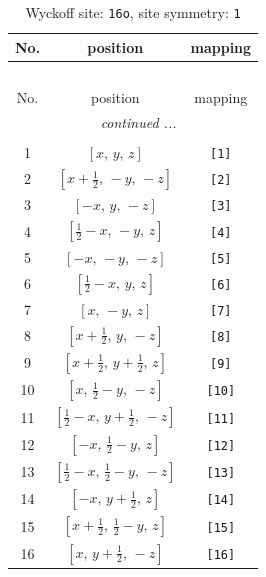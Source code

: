 \documentclass[fleqn,8pt]{jsarticle}
\begin{document}
\begin{longtable}{ccc}
\caption{Wyckoff site: {\tt 16o}, site symmetry: {\tt 1}}
 \\
 \hline \hline
No. & position & mapping \\ \hline \endfirsthead

\multicolumn{2}{l}{\tablename\ \thetable{}} \\
 \hline \hline
No. & position & mapping \\ \hline \endhead

 \hline \hline
\multicolumn{2}{r}{\footnotesize\it continued ...} \\ \endfoot

 \hline \hline
\multicolumn{2}{r}{} \\ \endlastfoot

1 & $\left[ x,\, y,\, z \right]$ & {\tt [1]} \\ \hline
2 & $\left[ x + \frac{1}{2},\, - y,\, - z \right]$ & {\tt [2]} \\ \hline
3 & $\left[ - x,\, y,\, - z \right]$ & {\tt [3]} \\ \hline
4 & $\left[ \frac{1}{2} - x,\, - y,\, z \right]$ & {\tt [4]} \\ \hline
5 & $\left[ - x,\, - y,\, - z \right]$ & {\tt [5]} \\ \hline
6 & $\left[ \frac{1}{2} - x,\, y,\, z \right]$ & {\tt [6]} \\ \hline
7 & $\left[ x,\, - y,\, z \right]$ & {\tt [7]} \\ \hline
8 & $\left[ x + \frac{1}{2},\, y,\, - z \right]$ & {\tt [8]} \\ \hline
9 & $\left[ x + \frac{1}{2},\, y + \frac{1}{2},\, z \right]$ & {\tt [9]} \\ \hline
10 & $\left[ x,\, \frac{1}{2} - y,\, - z \right]$ & {\tt [10]} \\ \hline
11 & $\left[ \frac{1}{2} - x,\, y + \frac{1}{2},\, - z \right]$ & {\tt [11]} \\ \hline
12 & $\left[ - x,\, \frac{1}{2} - y,\, z \right]$ & {\tt [12]} \\ \hline
13 & $\left[ \frac{1}{2} - x,\, \frac{1}{2} - y,\, - z \right]$ & {\tt [13]} \\ \hline
14 & $\left[ - x,\, y + \frac{1}{2},\, z \right]$ & {\tt [14]} \\ \hline
15 & $\left[ x + \frac{1}{2},\, \frac{1}{2} - y,\, z \right]$ & {\tt [15]} \\ \hline
16 & $\left[ x,\, y + \frac{1}{2},\, - z \right]$ & {\tt [16]} \\
\end{longtable}
\end{document}
